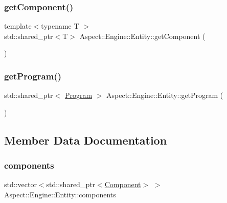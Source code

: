 \subsubsection{\texorpdfstring{get\+Component()}{getComponent()}}
{\footnotesize\ttfamily template$<$typename T $>$ \\
std\+::shared\+\_\+ptr$<$T$>$ Aspect\+::\+Engine\+::\+Entity\+::get\+Component (\begin{DoxyParamCaption}{ }\end{DoxyParamCaption})\hspace{0.3cm}{\ttfamily [inline]}}

\mbox{\label{class_aspect_1_1_engine_1_1_entity_a39566f856dd82efb948383c3037290a0}} 
\subsubsection{\texorpdfstring{get\+Program()}{getProgram()}}
{\footnotesize\ttfamily std\+::shared\+\_\+ptr$<$ \mbox{\hyperlink{class_aspect_1_1_engine_1_1_program}{Program}} $>$ Aspect\+::\+Engine\+::\+Entity\+::get\+Program (\begin{DoxyParamCaption}{ }\end{DoxyParamCaption})}



\subsection{Member Data Documentation}
\mbox{\label{class_aspect_1_1_engine_1_1_entity_ae7380f6b33ebbb9d4859a9de11549769}} 
\subsubsection{\texorpdfstring{components}{components}}
{\footnotesize\ttfamily std\+::vector$<$std\+::shared\+\_\+ptr$<$\mbox{\hyperlink{class_aspect_1_1_engine_1_1_component}{Component}}$>$ $>$ Aspect\+::\+Engine\+::\+Entity\+::components}

